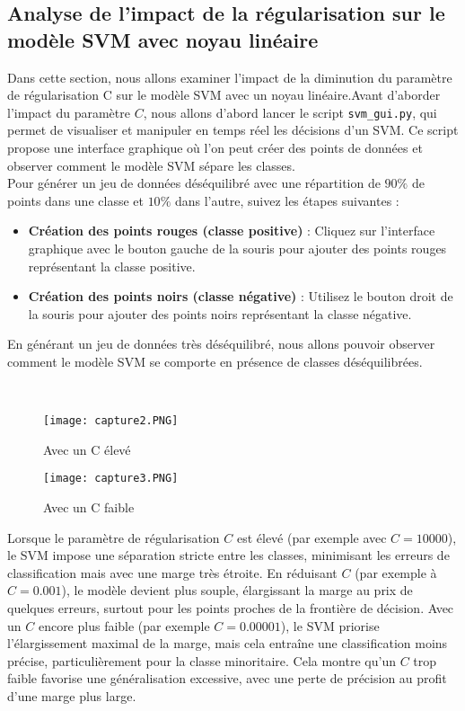 \documentclass{article}
\begin{document}
\begin{itemize}
\section{Analyse de l'impact de la régularisation sur le modèle SVM avec
noyau linéaire}

Dans cette section, nous allons examiner l'impact de la diminution du 
paramètre de régularisation C sur le modèle SVM avec un noyau 
linéaire.Avant d'aborder l'impact du paramètre \( C \), nous allons 
d'abord lancer le script \texttt{svm\_gui.py}, qui permet de visualiser 
et manipuler en temps réel les décisions d'un SVM. Ce script propose une 
interface graphique où l'on peut créer des points de données et observer 
comment le modèle SVM sépare les classes.\\

Pour générer un jeu de données déséquilibré avec une répartition de \( 
90\% \) de points dans une classe et \( 10\% \) dans l'autre, suivez les
étapes suivantes :\\

\begin{itemize}
    \item \textbf{Création des points rouges (classe positive)} : Cliquez sur l'interface graphique avec le bouton gauche de la souris pour ajouter des points rouges représentant la classe positive.
    \item \textbf{Création des points noirs (classe négative)} : Utilisez le bouton droit de la souris pour ajouter des points noirs représentant la classe négative.
\end{itemize}

En générant un jeu de données très déséquilibré, nous allons pouvoir 
observer comment le modèle SVM se comporte en présence de classes 
déséquilibrées.


\
\begin{figure}[H]
    \centering
    \begin{minipage}{0.45\textwidth}
        \centering
        \texttt{[image: capture2.PNG]}
        \caption{Avec un C élevé}
    \end{minipage}\hfill
    \begin{minipage}{0.46\textwidth}
        \centering
        \texttt{[image: capture3.PNG]}
        \caption{Avec un C faible }
    \end{minipage}
\end{figure}
Lorsque le paramètre de régularisation \( C \) est élevé (par exemple 
avec \( C = 10000 \)), le SVM impose une séparation stricte entre les 
classes, minimisant les erreurs de classification mais avec une marge 
très étroite. En réduisant \( C \) (par exemple à \( C = 0.001 \)), le 
modèle devient plus souple, élargissant la marge au prix de quelques 
erreurs, surtout pour les points proches de la frontière de décision. 
Avec un \( C \) encore plus faible (par exemple \( C = 0.00001 \)), le 
SVM priorise l'élargissement maximal de la marge, mais cela entraîne une 
classification moins précise, particulièrement pour la classe 
minoritaire. Cela montre qu'un \( C \) trop faible favorise une 
généralisation excessive, avec une perte de précision au profit d'une 
marge plus large.\\

\end{itemize}
\end{document}
